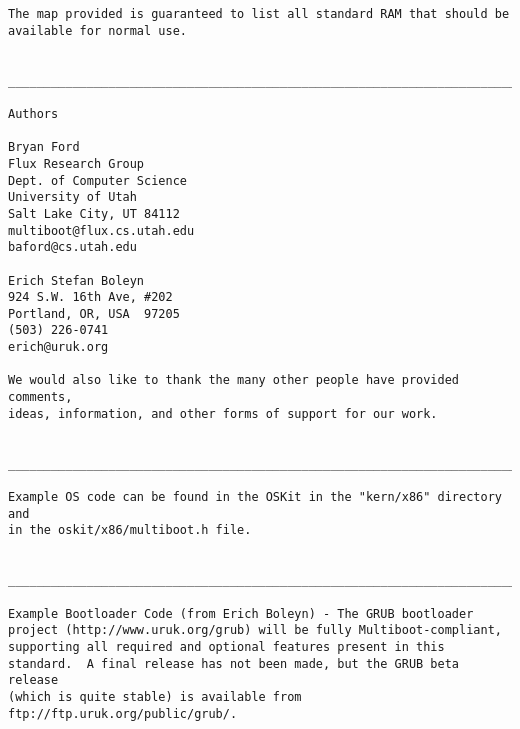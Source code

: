 \begin{verbatim}
The map provided is guaranteed to list all standard RAM that should be
available for normal use.

  __________________________________________________________________________
                                       
Authors

Bryan Ford
Flux Research Group
Dept. of Computer Science
University of Utah
Salt Lake City, UT 84112
multiboot@flux.cs.utah.edu
baford@cs.utah.edu

Erich Stefan Boleyn
924 S.W. 16th Ave, #202
Portland, OR, USA  97205
(503) 226-0741
erich@uruk.org

We would also like to thank the many other people have provided comments,
ideas, information, and other forms of support for our work.

  __________________________________________________________________________
                                       
Example OS code can be found in the OSKit in the "kern/x86" directory and
in the oskit/x86/multiboot.h file.

  __________________________________________________________________________
                                       
Example Bootloader Code (from Erich Boleyn) - The GRUB bootloader
project (http://www.uruk.org/grub) will be fully Multiboot-compliant,
supporting all required and optional features present in this
standard.  A final release has not been made, but the GRUB beta release
(which is quite stable) is available from ftp://ftp.uruk.org/public/grub/.
\end{verbatim}

